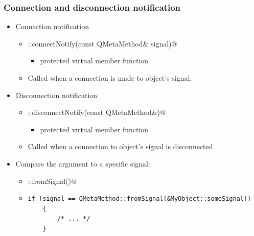 \begin{frame}[fragile]
  \frametitle{Connection and disconnection notification}
   \small
   \begin{itemize}
      \item Connection notification
      \begin{itemize}
        \item \verb@QObject::connectNotify(const QMetaMethod& signal)@
        \begin{itemize}
          \item protected virtual member function
        \end{itemize}
        \item Called when a connection is made to \verb@this@ object's signal.
      \end{itemize}
      \item Disconnection notification
      \begin{itemize}
        \item \verb@QObject::disconnectNotify(const QMetaMethod&)@
        \begin{itemize}
          \item protected virtual member function
        \end{itemize}
        \item Called when a connection to \verb@this@ object's signal is disconnected.
      \end{itemize}
      \item Compare the \verb@signal@ argument to a specific signal:
      \begin{itemize}
        \item \verb@QMetaMethod::fromSignal()@
        \item
        \begin{lstlisting}[basicstyle=\tiny\ttfamily]
	if (signal == QMetaMethod::fromSignal(&MyObject::someSignal))
	{
	    /* ... */
	}
        \end{lstlisting}
      \end{itemize}
    \end{itemize}
\end{frame}


